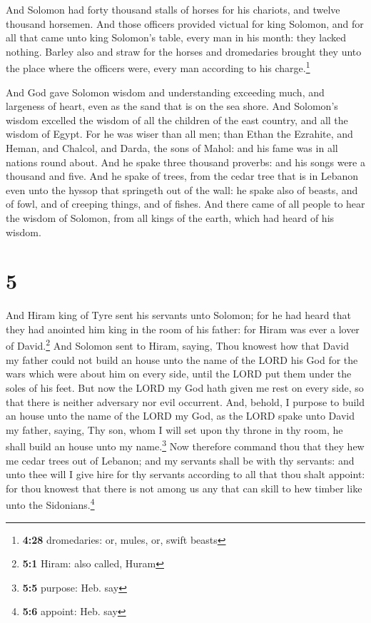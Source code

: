  And Solomon had forty thousand stalls of horses for his
chariots, and twelve thousand horsemen.  And those
officers provided victual for king Solomon, and for all that came unto
king Solomon's table, every man in his month: they lacked nothing.
 Barley also and straw for the horses and dromedaries
brought they unto the place where the officers were, every man according
to his charge.\footnote{\textbf{4:28} dromedaries: or, mules, or, swift
  beasts}

 And God gave Solomon wisdom and understanding exceeding
much, and largeness of heart, even as the sand that is on the sea shore.
 And Solomon's wisdom excelled the wisdom of all the
children of the east country, and all the wisdom of Egypt.
 For he was wiser than all men; than Ethan the Ezrahite,
and Heman, and Chalcol, and Darda, the sons of Mahol: and his fame was
in all nations round about.  And he spake three thousand
proverbs: and his songs were a thousand and five.  And he
spake of trees, from the cedar tree that is in Lebanon even unto the
hyssop that springeth out of the wall: he spake also of beasts, and of
fowl, and of creeping things, and of fishes.  And there
came of all people to hear the wisdom of Solomon, from all kings of the
earth, which had heard of his wisdom.

\hypertarget{section-4}{%
\section{5}\label{section-4}}

 And Hiram king of Tyre sent his servants unto Solomon;
for he had heard that they had anointed him king in the room of his
father: for Hiram was ever a lover of David.\footnote{\textbf{5:1}
  Hiram: also called, Huram}  And Solomon sent to Hiram,
saying,  Thou knowest how that David my father could not
build an house unto the name of the LORD his God for the wars which were
about him on every side, until the LORD put them under the soles of his
feet.  But now the LORD my God hath given me rest on every
side, so that there is neither adversary nor evil occurrent.
 And, behold, I purpose to build an house unto the name of
the LORD my God, as the LORD spake unto David my father, saying, Thy
son, whom I will set upon thy throne in thy room, he shall build an
house unto my name.\footnote{\textbf{5:5} purpose: Heb. say}
 Now therefore command thou that they hew me cedar trees
out of Lebanon; and my servants shall be with thy servants: and unto
thee will I give hire for thy servants according to all that thou shalt
appoint: for thou knowest that there is not among us any that can skill
to hew timber like unto the Sidonians.\footnote{\textbf{5:6} appoint:
  Heb. say}

